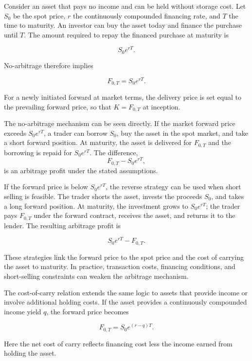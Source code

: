 Consider an asset that pays no income and can be held without storage cost. Let $S_0$ be the spot price, $r$ the continuously compounded financing rate, and $T$ the time to maturity. An investor can buy the asset today and finance the purchase until $T$. The amount required to repay the financed purchase at maturity is

\[
S_0 e^{rT}.
\]

No-arbitrage therefore implies

\begin{equation}
F_{0,T}=S_0 e^{rT}.
\label{eq:ch17-basic-forward-price}
\end{equation}

For a newly initiated forward at market terms, the delivery price is set equal to the prevailing forward price, so that $K=F_{0,T}$ at inception.

The no-arbitrage mechanism can be seen directly. If the market forward price exceeds $S_0e^{rT}$, a trader can borrow $S_0$, buy the asset in the spot market, and take a short forward position. At maturity, the asset is delivered for $F_{0,T}$ and the borrowing is repaid for $S_0e^{rT}$. The difference,
\[
F_{0,T}-S_0e^{rT},
\]
is an arbitrage profit under the stated assumptions.

If the forward price is below $S_0e^{rT}$, the reverse strategy can be used when short selling is feasible. The trader shorts the asset, invests the proceeds $S_0$, and takes a long forward position. At maturity, the investment grows to $S_0e^{rT}$; the trader pays $F_{0,T}$ under the forward contract, receives the asset, and returns it to the lender. The resulting arbitrage profit is

\[
S_0e^{rT}-F_{0,T}.
\]

These strategies link the forward price to the spot price and the cost of carrying the asset to maturity. In practice, transaction costs, financing conditions, and short-selling constraints can weaken the arbitrage mechanism.

The cost-of-carry relation extends the same logic to assets that provide income or involve additional holding costs. If the asset provides a continuously compounded income yield $q$, the forward price becomes

\begin{equation}
F_{0,T}=S_0 e^{(r-q)T}.
\label{eq:ch17-forward-price-income-yield}
\end{equation}

Here the net cost of carry reflects financing cost less the income earned from holding the asset.

